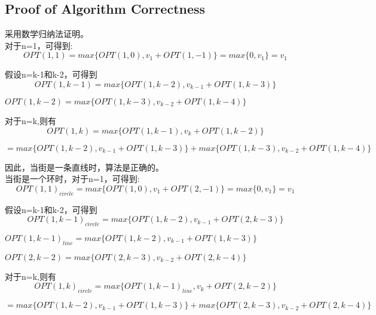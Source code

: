 \documentclass{article}
\begin{document}
\subsection{Proof of Algorithm Correctness}
采用数学归纳法证明。
\\

对于n=1，可得到:
\begin{equation}
OPT(1,1)=max\{OPT(1,0), v_1 + OPT(1,-1)\}=max\{0,v_1\}=v_1
\end{equation}

假设n=k-1和k-2，可得到
\begin{equation}
OPT(1,k-1)=max\{OPT(1,k-2), v_{k-1} + OPT(1, k-3)\}
\end{equation}

\begin{center}
$OPT(1,k-2)=max\{OPT(1,k-3), v_{k-2} + OPT(1, k-4)\}$
\end{center}

对于n=k,则有
\begin{equation}
OPT(1,k)=max\{OPT(1,k-1), v_{k} + OPT(1, k-2)\}
\end{equation}

\begin{center}
$=max\{OPT(1,k-2), v_{k-1} + OPT(1, k-3)\}+max\{OPT(1,k-3), v_{k-2} + OPT(1, k-4)\}$
\end{center}

因此，当街是一条直线时，算法是正确的。
\\

当街是一个环时，对于n=1，可得到:
\begin{equation}
OPT(1,1)_{circle}=max\{OPT(1,0), v_1 + OPT(2,-1)\}=max\{0,v_1\}=v_1
\end{equation}

假设n=k-1和k-2，可得到
\begin{equation}
OPT(1,k-1)_{circle}=max\{OPT(1,k-2), v_{k-1} + OPT(2, k-3)\}
\end{equation}
\begin{center}
$OPT(1,k-1)_{line}=max\{OPT(1,k-2), v_{k-1} + OPT(1, k-3)\}$
\end{center}
\begin{center}
$OPT(2,k-2)=max\{OPT(2,k-3), v_{k-2} + OPT(2, k-4)\}$
\end{center}

对于n=k,则有
\begin{equation}
OPT(1,k)_{circle}=max\{OPT(1,k-1)_{line}, v_{k} + OPT(2, k-2)\}
\end{equation}

\begin{center}
$=max\{OPT(1,k-2), v_{k-1} + OPT(1, k-3)\}+max\{OPT(2,k-3), v_{k-2} + OPT(2, k-4)\}$
\end{center}
\end{document}
